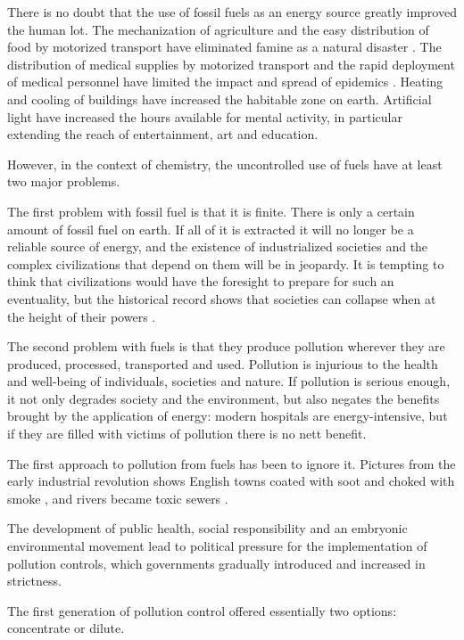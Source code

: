 There is no doubt that the use of fossil fuels as an energy source greatly
improved the human lot. The mechanization of agriculture and the easy
distribution of food by motorized transport have eliminated famine as a natural
disaster \autocite{Angelis2007}. The distribution of medical supplies by
motorized transport and the rapid deployment of medical personnel have limited
the impact and spread of epidemics \autocite{Ministere2018}. Heating and cooling
of buildings have increased the habitable zone on earth. Artificial light have
increased the hours available for mental activity, in particular extending the
reach of entertainment, art and education.

However, in the context of chemistry, the uncontrolled use of fuels have at
least two major problems.

The first problem with fossil fuel is that it is finite. There is only a certain
amount of fossil fuel on earth. If all of it is extracted it will no longer be a
reliable source of energy, and the existence of industrialized societies and the
complex civilizations that depend on them will be in jeopardy. It is tempting to
think that civilizations would have the foresight to prepare for such an
eventuality, but the historical record shows that societies can collapse when at
the height of their powers \autocite{Diamond2006}.

The second problem with fuels is that they produce pollution wherever they are
produced, processed, transported and used. Pollution is injurious to the health
and well-being of individuals, societies and nature. If pollution is serious
enough, it not only degrades society and the environment, but also negates the
benefits brought by the application of energy: modern hospitals are
energy-intensive, but if they are filled with victims of pollution there is no
nett benefit.

The first approach to pollution from fuels has been to ignore it. Pictures
from the early industrial revolution shows English towns coated with soot and
choked with smoke \autocite{Flick1980}, and rivers became toxic
sewers \autocite{Halliday2001}.

The development of public health, social responsibility \autocite{Szreter2003}
and an embryonic environmental movement \autocite{Williams1965} lead to
political pressure for the implementation of pollution controls, which governments
gradually introduced and increased in strictness.

The first generation of pollution control offered essentially two options:
concentrate or dilute.

